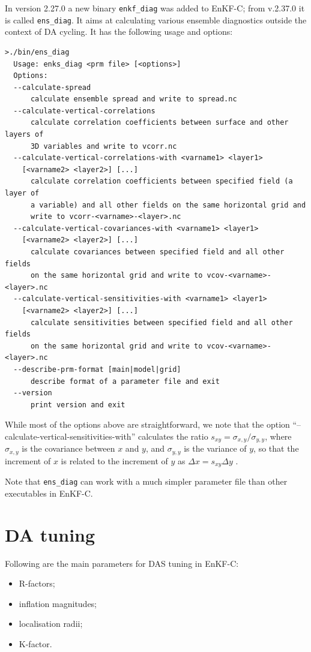 \documentclass[11pt]{report}
\begin{document}
In version 2.27.0 a new binary \verb|enkf_diag| was added to EnKF-C; from v.2.37.0 it is called \verb|ens_diag|.
It aims at calculating various ensemble diagnostics outside the context of DA cycling.
It has the following usage and options:
\begin{Verbatim}[frame=single,fontsize=\footnotesize]
>./bin/ens_diag
  Usage: enks_diag <prm file> [<options>]
  Options:
  --calculate-spread
      calculate ensemble spread and write to spread.nc
  --calculate-vertical-correlations
      calculate correlation coefficients between surface and other layers of
      3D variables and write to vcorr.nc
  --calculate-vertical-correlations-with <varname1> <layer1>
    [<varname2> <layer2>] [...]
      calculate correlation coefficients between specified field (a layer of
      a variable) and all other fields on the same horizontal grid and
      write to vcorr-<varname>-<layer>.nc
  --calculate-vertical-covariances-with <varname1> <layer1>
    [<varname2> <layer2>] [...]
      calculate covariances between specified field and all other fields
      on the same horizontal grid and write to vcov-<varname>-<layer>.nc
  --calculate-vertical-sensitivities-with <varname1> <layer1>
    [<varname2> <layer2>] [...]
      calculate sensitivities between specified field and all other fields
      on the same horizontal grid and write to vcov-<varname>-<layer>.nc
  --describe-prm-format [main|model|grid]
      describe format of a parameter file and exit
  --version
      print version and exit
\end{Verbatim}
While most of the options above are straightforward, we note that the option ``--calculate-vertical-sensitivities-with'' calculates the ratio $s_{xy} = \sigma_{x,y} / \sigma_{y,y}$, where $\sigma_{x,y}$ is the covariance between $x$ and $y$, and $\sigma_{y,y}$ is the variance of $y$, so that the increment of $x$ is related to the increment of $y$ as $\Delta x = s_{xy} \Delta y$ \citep[see e.g.][eq.\,5]{and03a}.

Note that \verb|ens_diag| can work with a much simpler parameter file than
other executables in EnKF-C.

\section{DA tuning}
\label{sec:datuning}

Following are the main parameters for DAS tuning in EnKF-C:
\begin{itemize}
\item R-factors;
\item inflation magnitudes;
\item localisation radii;
\item K-factor.
\end{itemize}
\end{document}
